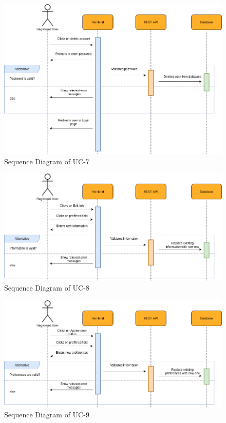         \begin{figure}[H]
            \centering
            \includegraphics[scale=0.5]{./diagrams/sequence/seq-07.png}
            \caption{Sequence Diagram of UC-7}
            \label{fig:seq-07}
            
        \end{figure}
    

        \begin{figure}[H]
            \centering
            \includegraphics[scale=0.5]{./diagrams/sequence/seq-08.png}
            \caption{Sequence Diagram of UC-8}
            \label{fig:seq-08}
            
        \end{figure}
    

        \begin{figure}[H]
            \centering
            \includegraphics[scale=0.5]{./diagrams/sequence/seq-09.png}
            \caption{Sequence Diagram of UC-9}
            \label{fig:seq-09}
            
        \end{figure}
    

